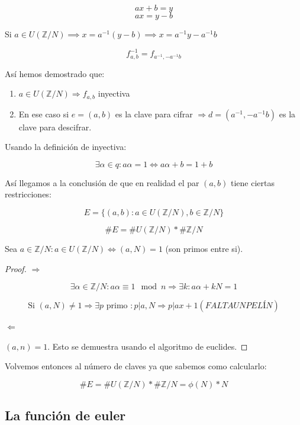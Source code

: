 			$$ax+b = y$$
			$$ax = y - b$$

			Si $a \in U(\mathbb{Z}/N)
			\implies 
			x = a^{-1} (y-b) \implies 
			x = a^{-1}y - a^{-1}b$
			

			$$f^{-1}_{a,b} = f_{a^{-1},-a^{-1}b}$$

			Así hemos demostrado que:

			\begin{enumerate}
				\item $a \in U(\mathbb{Z}/N) \Rightarrow f_{a,b}$ inyectiva
				\item En ese caso si $e = (a,b)$ es la clave para cifrar $\Rightarrow d = (a^{-1},-a^{-1}b)$ es la clave para descifrar.
			\end{enumerate}

			Usando la definición de inyectiva:

				$$ \exists \alpha \in q : a \alpha = 1 \Leftrightarrow a \alpha + b = 1 + b $$

			Así llegamos a la conclusión de que en realidad el par $(a,b)$ tiene ciertas restricciones:

			$$ E = \{ (a,b): a \in U(\mathbb{Z}/N), b \in \mathbb{Z}/N \} $$

			$$ \#E = \#U(\mathbb{Z}/N) * \#\mathbb{Z}/N $$


			\begin{prop}
				Sea $a \in \mathbb{Z}/N : a \in U(\mathbb{Z}/N) \Leftrightarrow (a,N) = 1$ (son primos entre si).

				\begin{proof}

					\textbf{$\Rightarrow$}

					$$\exists \alpha \in \mathbb{Z}/N : a \alpha \equiv 1 \mod n \Rightarrow \exists k : a\alpha + kN = 1$$

					$$\text{Si } (a,N) \neq 1 \Rightarrow \exists p \text{ primo } : p | a, N \Rightarrow p | ax + 1 (FALTA UN PELÍN)$$

					\textbf{$\Leftarrow$}

					$(a,n) = 1$. Esto se demuestra usando el algoritmo de euclides. 

				\end{proof}
			\end{prop}


			Volvemos entonces al número de claves ya que sabemos como calcularlo:

			$$ \#E = \#U(\mathbb{Z}/N) * \#\mathbb{Z}/N = \phi(N)*N $$


			\subsection{La función de euler}

